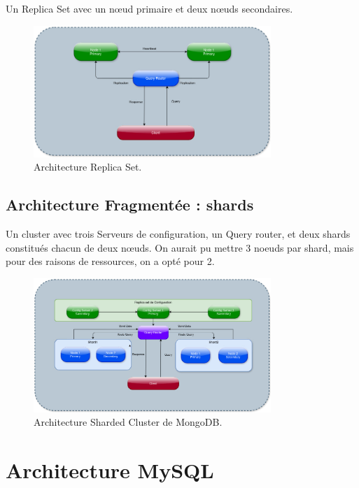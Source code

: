 \documentclass[12pt,a4paper]{report}
\begin{document}
        Un Replica Set avec un nœud primaire et deux nœuds secondaires.
        \begin{figure}[H]
            \centering
            \includegraphics[width=0.8\textwidth]{architectures/MongoDBReplica.jpg}
            \caption{Architecture Replica Set.}
            \label{fig:mongo-replica-set}
        \end{figure}

    \subsection{Architecture Fragmentée : shards}
        Un cluster avec trois Serveurs de configuration, un Query router, et deux shards constitués chacun de deux nœuds.
        On aurait pu mettre 3 noeuds par shard, mais pour des raisons de ressources, on a opté pour 2.

        \begin{figure}
            \centering
            \includegraphics[width=0.8\textwidth]{architectures/MongoDBShards.jpg}
            \caption{Architecture Sharded Cluster de MongoDB.}
            \label{fig:mongo-sharded-cluster}
        \end{figure}

\section{Architecture MySQL}
\end{document}
